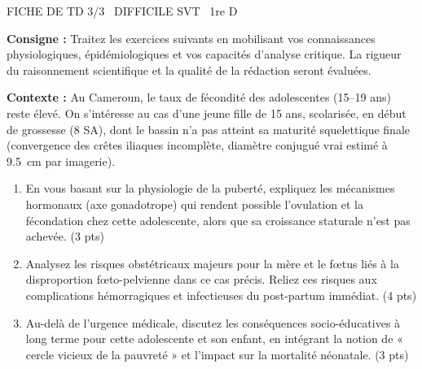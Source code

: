 \documentclass[11pt]{article}
\begin{document}
\begin{tcolorbox}[enhanced,colback=popink,colframe=popink,arc=10pt,boxrule=0pt,left=12pt,right=12pt,top=9pt,bottom=9pt]
{\color{white}\popxbold\small FICHE DE TD 3/3 \textbullet\ DIFFICILE \hfill SVT \textbullet\ 1re D\par}
\end{tcolorbox}
\vspace{4pt}
\noindent\textbf{Consigne :} Traitez les exercices suivants en mobilisant vos connaissances physiologiques, épidémiologiques et vos capacités d'analyse critique. La rigueur du raisonnement scientifique et la qualité de la rédaction seront évaluées.

\begin{exercice}
\textbf{Contexte :} Au Cameroun, le taux de fécondité des adolescentes (15--19 ans) reste élevé. On s'intéresse au cas d'une jeune fille de 15 ans, scolarisée, en début de grossesse (8 SA), dont le bassin n'a pas atteint sa maturité squelettique finale (convergence des crêtes iliaques incomplète, diamètre conjugué vrai estimé à \SI{9,5}{\centi\meter} par imagerie).

\begin{enumerate}
    \item En vous basant sur la physiologie de la puberté, expliquez les mécanismes hormonaux (axe gonadotrope) qui rendent possible l'ovulation et la fécondation chez cette adolescente, alors que sa croissance staturale n'est pas achevée. (3 pts)
    \item Analysez les risques obstétricaux majeurs pour la mère et le fœtus liés à la disproportion fœto-pelvienne dans ce cas précis. Reliez ces risques aux complications hémorragiques et infectieuses du post-partum immédiat. (4 pts)
    \item Au-delà de l'urgence médicale, discutez les conséquences socio-éducatives à long terme pour cette adolescente et son enfant, en intégrant la notion de « cercle vicieux de la pauvreté » et l'impact sur la mortalité néonatale. (3 pts)
\end{enumerate}
\end{exercice}
\end{document}
